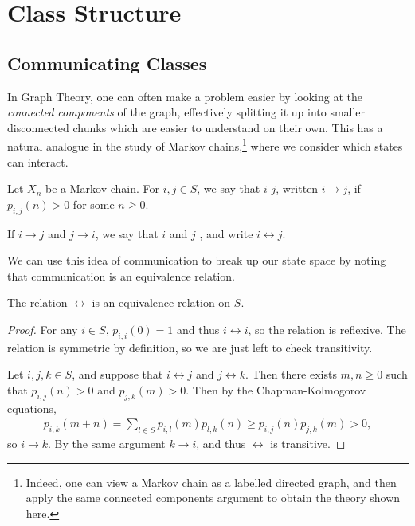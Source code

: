 \section{Class Structure}


\subsection{Communicating Classes}

In Graph Theory, one can often make a problem easier by looking at the \emph{connected components} of the graph, effectively splitting it up into smaller disconnected chunks which are easier to understand on their own. 
This has a natural analogue in the study of Markov chains,\footnote{Indeed, one can view a Markov chain as a labelled directed graph, and then apply the same connected components argument to obtain the theory shown here.} where we consider which states can interact.

\begin{definition}[Communication]
	Let $X_n$ be a Markov chain. For $i, j \in S$, we say that $i$  $j$, written $i \rightarrow j$, if $p_{i, j}(n) > 0$ for some $n \geq 0$.

	If $i \rightarrow j$ and $j \rightarrow i$, we say that $i$ and $j$ , and write $i \leftrightarrow j$.
\end{definition}

We can use this idea of communication to break up our state space by noting that communication is an equivalence relation.

\begin{theorem}
The relation $\leftrightarrow$ is an equivalence relation on $S$.
\end{theorem}
\begin{proof}
	For any $i \in S$, $p_{i, i}(0) = 1$ and thus $i \leftrightarrow i$, so the relation is reflexive. The relation is symmetric by definition, so we are just left to check transitivity.

	Let $i, j, k \in S$, and suppose that $i \leftrightarrow j$ and $j \leftrightarrow k$. Then there exists $m, n \geq 0$ such that $p_{i, j}(n) > 0$ and $p_{j, k}(m) > 0$. Then by the Chapman-Kolmogorov equations,
	\begin{align*}
		p_{i, k}(m + n) = \sum_{l \in S}p_{i, l}(m)p_{l, k}(n) \geq p_{i, j}(n) p_{j, k}(m) > 0,
	\end{align*}
	so $i \rightarrow k$. By the same argument $k \rightarrow i$, and thus $\leftrightarrow$ is transitive.
\end{proof}

